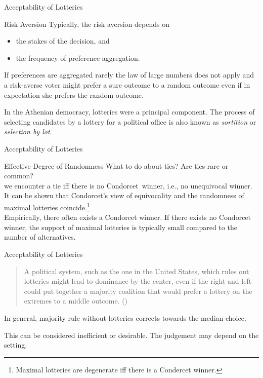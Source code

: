\documentclass{beamer}
\theoremstyle{definition}
\def\g#1{{\usebeamercolor[fg]{block title example}{#1}}}
\begin{document}
\begin{frame}{Acceptability of Lotteries}
\begin{block}{Risk Aversion}
Typically, the risk aversion depends on
\begin{itemize}
    \item the stakes of the decision\pause, and
    \item the frequency of preference aggregation.
\end{itemize}\pause

If preferences are aggregated rarely the law of large numbers does not apply and a risk-averse voter might prefer a sure outcome to a random outcome even if in expectation she prefers the random outcome.
\end{block}\pause\vspace{10pt}

In the Athenian democracy, lotteries were a principal component. The process of selecting candidates by a lottery for a political office is also known as \emph{sortition} or \emph{selection by lot}.
\end{frame}

\begin{frame}{Acceptability of Lotteries}
\begin{block}{Effective Degree of Randomness}
What to do about ties? Are ties rare or common?\pause \\[15pt]

\g{Condorcet view:} we encounter a tie iff there is no Condorcet~winner, i.e., no unequivocal winner.\pause \\[5pt]
It can be shown that Condorcet's view of equivocality and the randomness of maximal lotteries coincide.\footnote{Maximal lotteries are degenerate iff there is a Condercet winner.}\pause \\[15pt]

Empirically, there often exists a Condorcet winner. If there exists no Condorcet winner, the support of maximal lotteries is typically small compared to the number of alternatives.
\end{block}
\end{frame}

\begin{frame}{Acceptability of Lotteries}
\blockquote{A political system, such as the one in the United States, which
 rules out lotteries might lead to dominance by the center, even if
 the right and left could put together a majority coalition that would
 prefer a lottery on the extremes to a middle outcome. (\cite{Zeckhauser1969})}\pause
 
In general, majority rule without lotteries corrects towards the median choice.\par
This can be considered inefficient or desirable. The judgement may depend on the setting.
\end{frame}
\end{document}
